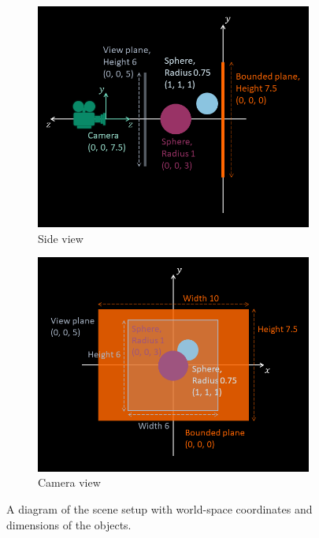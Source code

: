 \documentclass{../../../fal_assignment}
\begin{document}
\begin{figure}[ht]
	\begin{center}
		\begin{subfigure}[b]{0.45\linewidth}
			\includegraphics[width=\linewidth]{scene_side}
			\caption{Side view}
		\end{subfigure}
		\begin{subfigure}[b]{0.45\linewidth}
			\includegraphics[width=\linewidth]{scene_camera_view}
			\caption{Camera view}
		\end{subfigure}
	\end{center}
	\caption{A diagram of the scene setup with world-space coordinates and dimensions of the objects.}
	\label{fig:scene}
\end{figure}
\end{document}
